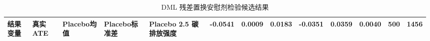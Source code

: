 \begin{table}
\caption{DML 残差置换安慰剂检验候选结果}
\label{tab:dml_placebo_candidate}
\begin{tabular}{lllllllll}
\toprule
结果变量 & 真实ATE & Placebo均值 & Placebo标准差 & Placebo 2.5%
\midrule
碳排放强度 & -0.0541 & 0.0009 & 0.0183 & -0.0351 & 0.0359 & 0.0040 & 500 & 1456 \\
\bottomrule
\end{tabular}
\end{table}
